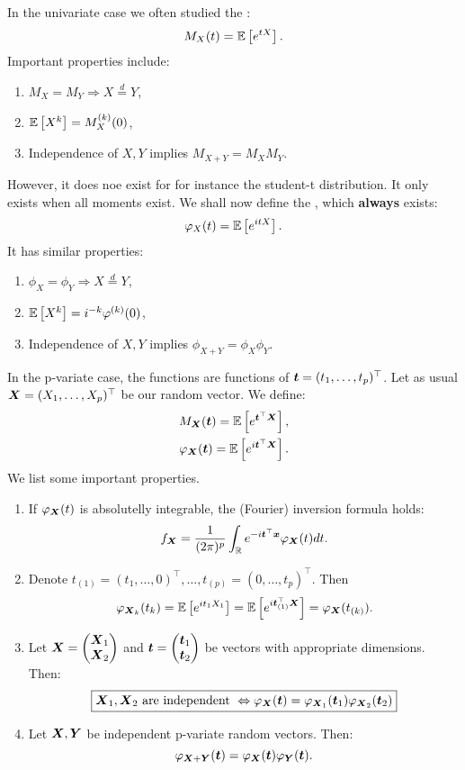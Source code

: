 In the univariate case we often studied the :
$$
    M_X(t) = \mathbb{E}\left[e^{tX}\right].
$$
Important properties include:
\begin{enumerate}
    \item $M_X = M_Y \Rightarrow X \overset{d}{=} Y$,
    \item $\mathbb{E}\left[X^k\right] = M^{(k)}_X(0)$,
    \item Independence of $X, Y$ implies $M_{X+Y} = M_X M_Y$.
\end{enumerate}
However, it does noe exist for for instance the student-t distribution. It only exists when all moments exist. We shall now define the , which \textbf{always} exists:
$$
    \varphi_X(t) = \mathbb{E}\left[e^{itX}\right].
$$
It has similar properties:
\begin{enumerate}
    \item $\phi_X = \phi_Y \Rightarrow X \overset{d}{=} Y$,
    \item $\mathbb{E}\left[X^k\right] = i^{-k} \varphi^{(k)}(0)$,
    \item Independence of $X, Y$ implies $\phi_{X+Y} = \phi_X \phi_Y$.
\end{enumerate}
In the p-variate case, the functions are functions of $\boldsymbol{t}=(t_1,\dots,t_p)^\top$. Let as usual $\boldsymbol{X}=(X_1,\dots,X_p)^\top$ be our random vector. We define:
\begin{align*}
    M_{\boldsymbol{X}}(\boldsymbol{t}) = \mathbb{E}\left[e^{\boldsymbol{t}^\top \boldsymbol{X}}\right], \\
    \varphi_{\boldsymbol{X}}(\boldsymbol{t}) = \mathbb{E}\left[e^{i\boldsymbol{t}^\top \boldsymbol{X}}\right].
\end{align*}
We list some important properties.
\begin{enumerate}
    \item If $\varphi_{\boldsymbol{X}}(t)$ is absolutelly integrable, the (Fourier) inversion formula holds:
    $$
        f_{\boldsymbol{X}} = \frac{1}{(2\pi)^p} \int_{\mathbb{R}} e^{-i\boldsymbol{t}^\top\boldsymbol{x}} \varphi_{\boldsymbol{X}}(t) dt.
    $$
    \item Denote $t_{(1)} = (t_1,\dots,0)^\top, \dots, t_{(p)}=(0,\dots,t_p)^\top$. Then 
    $$
        \varphi_{\boldsymbol{X}_k}(t_k) = \mathbb{E}\left[e^{it_1 X_1}\right] = \mathbb{E}\left[e^{i\boldsymbol{t}_{(1)}^\top \boldsymbol{X}}\right] =  \varphi_{\boldsymbol{X}}(t_{(k)}).
    $$
    \item Let $\boldsymbol{X}=\begin{pmatrix} \boldsymbol{X}_1 \\ \boldsymbol{X}_2 \end{pmatrix}$ and $\boldsymbol{t}=\begin{pmatrix} \boldsymbol{t}_1 \\ \boldsymbol{t}_2 \end{pmatrix}$ be vectors with appropriate dimensions. Then:
    \begin{equation}
        \boxed{\boldsymbol{X}_1, \boldsymbol{X}_2 \textrm{ are independent } \Leftrightarrow \varphi_{\boldsymbol{X}}(\boldsymbol{t}) = \varphi_{\boldsymbol{X}_1}(\boldsymbol{t}_1)\varphi_{\boldsymbol{X}_2}(\boldsymbol{t}_2)}
    \end{equation} 
    \item Let $\boldsymbol{X}, \boldsymbol{Y}$ be independent p-variate random vectors. Then:
    $$
        \varphi_{\boldsymbol{X}+\boldsymbol{Y}}(\boldsymbol{t}) = \varphi_{\boldsymbol{X}}(\boldsymbol{t})\varphi_{\boldsymbol{Y}}(\boldsymbol{t}).
    $$
\end{enumerate}
